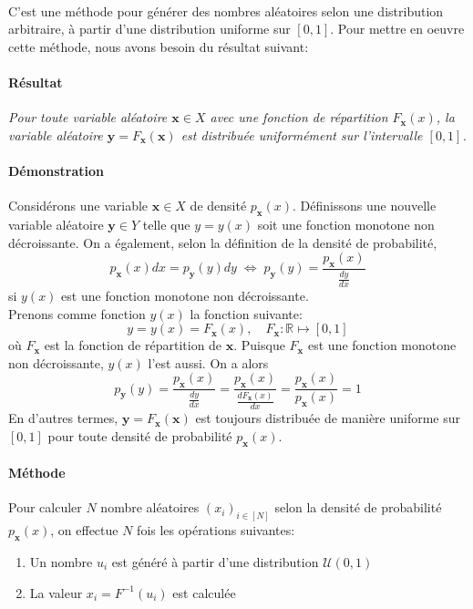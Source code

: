 \documentclass[a4paper]{article}
\begin{document}
\begin{description}
		\paragraph{}
		C'est une méthode pour générer des nombres aléatoires
		selon une distribution arbitraire, à partir d'une distribution uniforme
		sur \([0,1]\). Pour mettre en oeuvre cette méthode, nous avons besoin du
		résultat suivant:
		\paragraph{Résultat}
		\emph{Pour toute variable aléatoire \(\mathbf x\in X\) avec une fonction
		de répartition \(F_{\mathbf x}(x)\), la variable aléatoire
		\(\mathbf y=F_{\mathbf x}(\mathbf x)\) est distribuée uniformément sur
		l'intervalle \([0,1]\).}
		\paragraph{Démonstration}
		Considérons une variable \(\mathbf x\in X\) de densité
		\(p_{\mathbf x}(x)\). Définissons une nouvelle variable aléatoire
		\(\mathbf y\in Y\) telle que \(y=y(x)\) soit une fonction monotone non
		décroissante. On a également, selon la définition de la densité de
		probabilité,
		\[
			p_{\mathbf x}(x)dx=p_{\mathbf y}(y)dy \;\Leftrightarrow\;
			p_{\mathbf y}(y) = \frac{p_{\mathbf x}(x)}{\frac{dy}{dx}}
		\]
		si \(y(x)\) est une fonction monotone non décroissante.\\
		Prenons comme fonction \(y(x)\) la fonction suivante:
		\[y=y(x)=F_{\mathbf x}(x),\quad F_{\mathbf x}:\mathbb{R}\mapsto[0,1]\]
		où \(F_{\mathbf x}\) est la fonction de répartition de \(\mathbf x\).
		Puisque \(F_{\mathbf x}\) est une fonction monotone non décroissante,
		\(y(x)\) l'est aussi.
		On a alors
		\[
			p_{\mathbf y}(y) = \frac{p_{\mathbf x}(x)}{\frac{dy}{dx}}=
			\frac{p_{\mathbf x}(x)}{\frac{dF_{\mathbf x}(x)}{dx}}=
			\frac{p_{\mathbf x}(x)}{p_{\mathbf x}(x)}=1
		\]
		En d'autres termes, \(\mathbf y=F_{\mathbf x}(\mathbf x)\) est toujours
		distribuée de manière uniforme sur \([0,1]\) pour toute densité de
		probabilité \(p_{\mathbf x}(x)\).
		\paragraph{Méthode} Pour calculer \(N\) nombre aléatoires
		\((x_i)_{i\in[N]}\) selon la densité de probabilité \(p_{\mathbf x}(x)\),
		on effectue \(N\) fois les opérations suivantes:
		\begin{enumerate}
			\item Un nombre \(u_i\) est généré à partir d'une distribution \(\mathcal U(0,1)\)
			\item La valeur \(x_i=F^{-1}(u_i)\) est calculée
		\end{enumerate}
\end{description}
\end{document}
